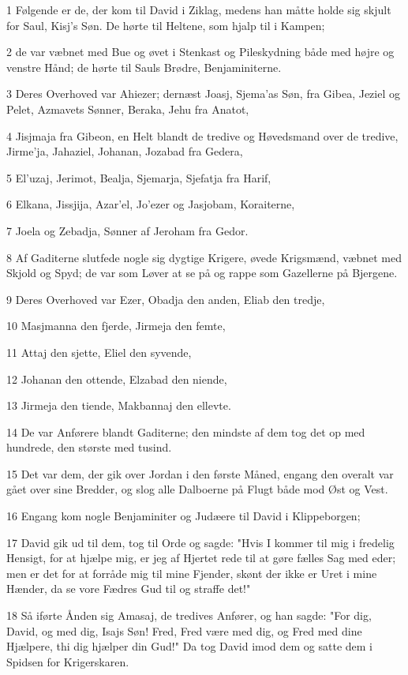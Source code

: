 \par 1 Følgende er de, der kom til David i Ziklag, medens han måtte holde sig skjult for Saul, Kisj's Søn. De hørte til Heltene, som hjalp til i Kampen;
\par 2 de var væbnet med Bue og øvet i Stenkast og Pileskydning både med højre og venstre Hånd; de hørte til Sauls Brødre, Benjaminiterne.
\par 3 Deres Overhoved var Ahiezer; dernæst Joasj, Sjema'as Søn, fra Gibea, Jeziel og Pelet, Azmavets Sønner, Beraka, Jehu fra Anatot,
\par 4 Jisjmaja fra Gibeon, en Helt blandt de tredive og Høvedsmand over de tredive, Jirme'ja, Jahaziel, Johanan, Jozabad fra Gedera,
\par 5 El'uzaj, Jerimot, Bealja, Sjemarja, Sjefatja fra Harif,
\par 6 Elkana, Jissjija, Azar'el, Jo'ezer og Jasjobam, Koraiterne,
\par 7 Joela og Zebadja, Sønner af Jeroham fra Gedor.
\par 8 Af Gaditerne slutfede nogle sig dygtige Krigere, øvede Krigsmænd, væbnet med Skjold og Spyd; de var som Løver at se på og rappe som Gazellerne på Bjergene.
\par 9 Deres Overhoved var Ezer, Obadja den anden, Eliab den tredje,
\par 10 Masjmanna den fjerde, Jirmeja den femte,
\par 11 Attaj den sjette, Eliel den syvende,
\par 12 Johanan den ottende, Elzabad den niende,
\par 13 Jirmeja den tiende, Makbannaj den ellevte.
\par 14 De var Anførere blandt Gaditerne; den mindste af dem tog det op med hundrede, den største med tusind.
\par 15 Det var dem, der gik over Jordan i den første Måned, engang den overalt var gået over sine Bredder, og slog alle Dalboerne på Flugt både mod Øst og Vest.
\par 16 Engang kom nogle Benjaminiter og Judæere til David i Klippeborgen;
\par 17 David gik ud til dem, tog til Orde og sagde: "Hvis I kommer til mig i fredelig Hensigt, for at hjælpe mig, er jeg af Hjertet rede til at gøre fælles Sag med eder; men er det for at forråde mig til mine Fjender, skønt der ikke er Uret i mine Hænder, da se vore Fædres Gud til og straffe det!"
\par 18 Så iførte Ånden sig Amasaj, de tredives Anfører, og han sagde: "For dig, David, og med dig, Isajs Søn! Fred, Fred være med dig, og Fred med dine Hjælpere, thi dig hjælper din Gud!" Da tog David imod dem og satte dem i Spidsen for Krigerskaren.
